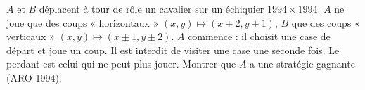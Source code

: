 $A$ et $B$ déplacent à tour de rôle un cavalier sur un échiquier $1994 \times 1994$. $A$ ne joue que des coups « horizontaux » $(x, y) \mapsto (x \pm 2, y \pm 1)$, $B$ que des coups « verticaux » $(x, y) \mapsto (x \pm 1, y \pm 2)$. $A$ commence : il choisit une case de départ et joue un coup. Il est interdit de visiter une case une seconde fois. Le perdant est celui qui ne peut plus jouer. Montrer que $A$ a une stratégie gagnante (ARO 1994).
